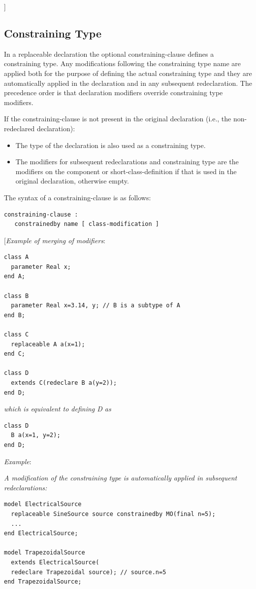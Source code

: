 \documentclass[10pt,a4paper]{report}
\def\doublelabel#1{\label{#1}}
\begin{document}
{]}

\subsection{Constraining Type}\doublelabel{constraining-type}

In a replaceable declaration the optional constraining-clause defines a
constraining type. Any modifications following the constraining type
name are applied both for the purpose of defining the actual
constraining type and they are automatically applied in the declaration
and in any subsequent redeclaration. The precedence order is that
declaration modifiers override constraining type modifiers.

If the constraining-clause is not present in the original declaration
(i.e., the non-redeclared declaration):

\begin{itemize}
\item
  The type of the declaration is also used as a constraining type.
\item
  The modifiers for subsequent redeclarations and constraining type are
  the modifiers on the component or short-class-definition if that is
  used in the original declaration, otherwise empty.
\end{itemize}

The syntax of a constraining-clause is as follows:
\begin{lstlisting}[language=grammar]
constraining-clause :
   constrainedby name [ class-modification ]
\end{lstlisting}
{[}\emph{Example of merging of modifiers}:
\begin{lstlisting}[language=modelica]
class A
  parameter Real x;
end A;
  
class B
  parameter Real x=3.14, y; // B is a subtype of A
end B;

class C
  replaceable A a(x=1);
end C;

class D
  extends C(redeclare B a(y=2));
end D;
\end{lstlisting}

\emph{which is equivalent to defining D as }
\begin{lstlisting}[language=modelica]
class D
  B a(x=1, y=2);
end D;
\end{lstlisting}
\emph{Example}:

\emph{A modification of the constraining type is automatically applied
in subsequent redeclarations:}
\begin{lstlisting}[language=modelica]
model ElectricalSource
  replaceable SineSource source constrainedby MO(final n=5);
  ...
end ElectricalSource;

model TrapezoidalSource
  extends ElectricalSource(
  redeclare Trapezoidal source); // source.n=5
end TrapezoidalSource;
\end{lstlisting}
\end{document}
